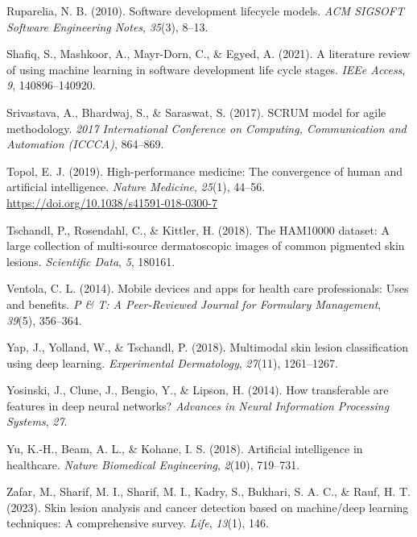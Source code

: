 \documentclass[
  12pt,
  oneside]{article}
\newlength{\cslhangindent}
\newenvironment{CSLReferences}[2] %
 {\begin{list}{}{%
  \setlength{\itemindent}{0pt}
  \setlength{\leftmargin}{0pt}
  \setlength{\parsep}{0pt}
  \ifodd #1
   \setlength{\leftmargin}{\cslhangindent}
   \setlength{\itemindent}{-1\cslhangindent}
  \fi
  \setlength{\itemsep}{#2\baselineskip}}}
 {\end{list}}
\begin{document}
\begin{CSLReferences}{1}{0}
Ruparelia, N. B. (2010). Software development lifecycle models.
\emph{ACM SIGSOFT Software Engineering Notes}, \emph{35}(3), 8--13.

Shafiq, S., Mashkoor, A., Mayr-Dorn, C., \& Egyed, A. (2021). A
literature review of using machine learning in software development life
cycle stages. \emph{IEEe Access}, \emph{9}, 140896--140920.

Srivastava, A., Bhardwaj, S., \& Saraswat, S. (2017). SCRUM model for
agile methodology. \emph{2017 International Conference on Computing,
Communication and Automation (ICCCA)}, 864--869.

Topol, E. J. (2019). High-performance medicine: The convergence of human
and artificial intelligence. \emph{Nature Medicine}, \emph{25}(1),
44--56. \url{https://doi.org/10.1038/s41591-018-0300-7}

Tschandl, P., Rosendahl, C., \& Kittler, H. (2018). The HAM10000
dataset: A large collection of multi-source dermatoscopic images of
common pigmented skin lesions. \emph{Scientific Data}, \emph{5}, 180161.

Ventola, C. L. (2014). Mobile devices and apps for health care
professionals: Uses and benefits. \emph{P \& T: A Peer-Reviewed Journal
for Formulary Management}, \emph{39}(5), 356--364.

Yap, J., Yolland, W., \& Tschandl, P. (2018). Multimodal skin lesion
classification using deep learning. \emph{Experimental Dermatology},
\emph{27}(11), 1261--1267.

Yosinski, J., Clune, J., Bengio, Y., \& Lipson, H. (2014). How
transferable are features in deep neural networks? \emph{Advances in
Neural Information Processing Systems}, \emph{27}.

Yu, K.-H., Beam, A. L., \& Kohane, I. S. (2018). Artificial intelligence
in healthcare. \emph{Nature Biomedical Engineering}, \emph{2}(10),
719--731.

Zafar, M., Sharif, M. I., Sharif, M. I., Kadry, S., Bukhari, S. A. C.,
\& Rauf, H. T. (2023). Skin lesion analysis and cancer detection based
on machine/deep learning techniques: A comprehensive survey.
\emph{Life}, \emph{13}(1), 146.

\end{CSLReferences}
\end{document}
